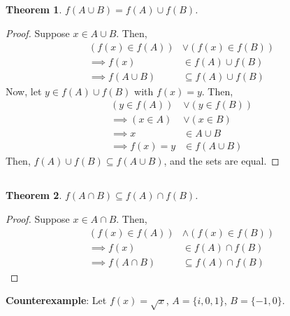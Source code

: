 \documentclass{article}
\newtheorem{theorem}{Theorem}
\begin{document}
\subsection{}

\begin{theorem}
    \(f(A \cup B) = f(A) \cup f(B)\).
\end{theorem}
\begin{proof}
    Suppose \(x \in A \cup B\).
    Then,
    \begin{align}
        (f(x) \in f(A)) &\lor (f(x) \in f(B)) \\
        \implies f(x) &\in f(A) \cup f(B) \\
        \implies f(A \cup B) &\subseteq f(A) \cup f(B)
    \end{align}
    Now, let \(y \in f(A) \cup f(B)\) with \(f(x) = y\).
    Then,
    \begin{align}
        (y \in f(A)) &\lor (y \in f(B)) \\
        \implies (x \in A) &\lor (x \in B) \\
        \implies x &\in A \cup B \\
        \implies f(x) = y &\in f(A \cup B)
    \end{align}
    Then, \(f(A) \cup f(B) \subseteq f(A \cup B)\), and the sets are equal.
\end{proof}

\subsection{}

\begin{theorem}
    \(f(A \cap B) \subseteq f(A) \cap f(B)\).
\end{theorem}
\begin{proof}
    Suppose \(x \in A \cap B\).
    Then,
    \begin{align}
        (f(x) \in f(A)) &\land (f(x) \in f(B)) \\
        \implies f(x) &\in f(A) \cap f(B) \\
        \implies f(A \cap B) &\subseteq f(A) \cap f(B)
    \end{align}
\end{proof}
\textbf{Counterexample}: Let \(f(x) = \sqrt{x}\), \(A = \{i, 0, 1\}\), \(B = \{-1, 0\}\).

\subsection{}
\end{document}
